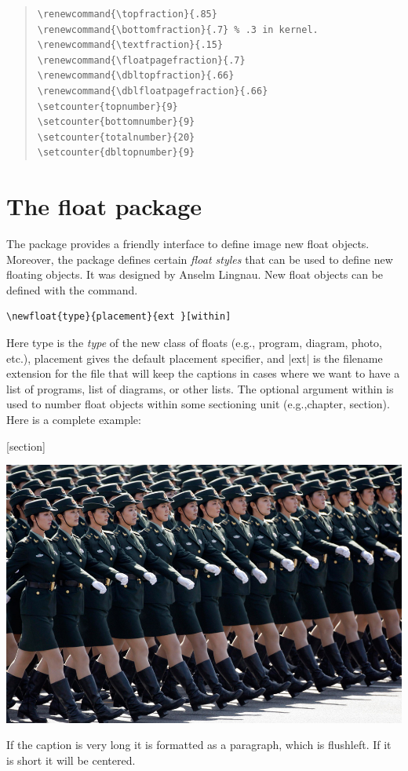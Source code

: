 \begin{quote}
\begin{verbatim}
\renewcommand{\topfraction}{.85}
\renewcommand{\bottomfraction}{.7} % .3 in kernel.
\renewcommand{\textfraction}{.15}
\renewcommand{\floatpagefraction}{.7}
\renewcommand{\dbltopfraction}{.66}
\renewcommand{\dblfloatpagefraction}{.66}
\setcounter{topnumber}{9}
\setcounter{bottomnumber}{9}
\setcounter{totalnumber}{20}
\setcounter{dbltopnumber}{9}
\end{verbatim}
\end{quote}

\section{The float package}
 
The  package provides a friendly interface to define image new float objects. Moreover, the package
defines certain \emph{float styles} that can be used to define new floating objects.  It
was designed by Anselm Lingnau. New float objects can be defined with the command.

\begin{verbatim}
\newfloat{type}{placement}{ext }[within]
\end{verbatim}



Here type is the \emph{type}  of the new class of floats (e.g., program, diagram, photo, etc.),
placement gives the default placement specifier, and |ext| is the filename extension
for the file that will keep the captions in cases where we want to have a list of programs,
list of diagrams, or other lists. The optional argument within is used to number float
objects within some sectioning unit (e.g.,chapter, section). Here is a complete example:

\begin{teXXX}
[section]
\end{teXXX}





\begin{Photo}
 \centering
 \includegraphics[width=0.80\linewidth]{./images/china-05.jpg}
\caption[a short caption]{If the caption is very long it is formatted as a paragraph, which is flushleft. If it is short it will be centered. }
\end{Photo}



